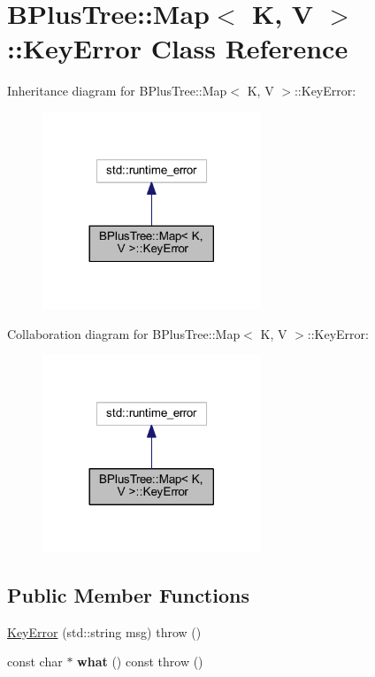 \hypertarget{class_b_plus_tree_1_1_map_1_1_key_error}{}\section{B\+Plus\+Tree\+:\+:Map$<$ K, V $>$\+:\+:Key\+Error Class Reference}
\label{class_b_plus_tree_1_1_map_1_1_key_error}


Inheritance diagram for B\+Plus\+Tree\+:\+:Map$<$ K, V $>$\+:\+:Key\+Error\+:
\nopagebreak
\begin{figure}[H]
\begin{center}
\leavevmode
\includegraphics[width=185pt]{class_b_plus_tree_1_1_map_1_1_key_error__inherit__graph}
\end{center}
\end{figure}


Collaboration diagram for B\+Plus\+Tree\+:\+:Map$<$ K, V $>$\+:\+:Key\+Error\+:
\nopagebreak
\begin{figure}[H]
\begin{center}
\leavevmode
\includegraphics[width=185pt]{class_b_plus_tree_1_1_map_1_1_key_error__coll__graph}
\end{center}
\end{figure}
\subsection*{Public Member Functions}
\begin{DoxyCompactItemize}
\item 
\hyperlink{class_b_plus_tree_1_1_map_1_1_key_error_a9cc95d98613dc60ed60d6da28d912918}{Key\+Error} (std\+::string msg)  throw ()
\item 
\mbox{\label{class_b_plus_tree_1_1_map_1_1_key_error_a4200fad129e5831436b936fae48c7b3d}} 
const char $\ast$ {\bfseries what} () const  throw ()
\end{DoxyCompactItemize}


